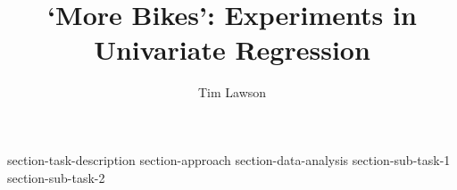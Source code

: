 \documentclass[11pt]{extarticle}
\begin{document}
\fancyhf{}
\fancyfoot[C]{\thepage}

\title{`More Bikes': Experiments in Univariate Regression}
\author[]{Tim Lawson}
\date{}

\maketitle

\begin{abstract}
  
\end{abstract}

{section-task-description}
{section-approach}
{section-data-analysis}
{section-sub-task-1}
{section-sub-task-2}

\printbibliography
\end{document}
